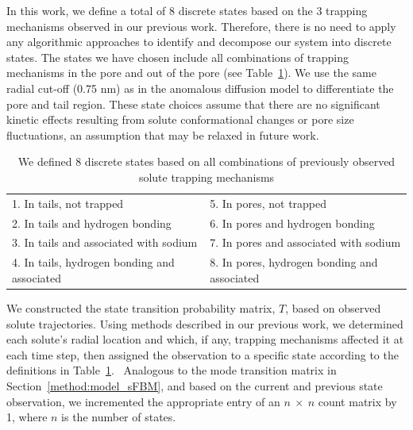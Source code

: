 \documentclass{article}
\begin{document}
  In this work, we define a total of 8 discrete states based on the 3 trapping
  mechanisms observed in our previous work. Therefore, there is no need to 
  apply any algorithmic approaches to identify and decompose our system into 
  discrete states. The states we have chosen include all combinations of trapping
  mechanisms in the pore and out of the pore (see Table~\ref{table:states}). We use
  the same radial cut-off (0.75 nm) as in the anomalous diffusion model to differentiate
  the pore and tail region. These state choices assume that there are no significant
  kinetic effects resulting from solute conformational changes or pore size fluctuations,
  an assumption that may be relaxed in future work.
  
  \begin{table}[!htb]
	  \centering
	  \begin{tabular}{|l|l|}
	  \hline
	  1. In tails, not trapped                     & 5. In pores, not trapped                     \\
	  2. In tails and hydrogen bonding             & 6. In pores and hydrogen bonding             \\
	  3. In tails and associated with sodium       & 7. In pores and associated with sodium       \\
	  4. In tails, hydrogen bonding and associated & 8. In pores, hydrogen bonding and associated \\
	  \hline
	  \end{tabular}
	  \caption{We defined 8 discrete states based on all combinations of previously observed solute
	  trapping mechanisms}\label{table:states}  
  \end{table}
  
  We constructed the state transition probability matrix, $T$, based on observed solute trajectories.
  Using methods described in our previous work, we determined each solute's radial location 
  and which, if any, trapping mechanisms affected it at each time step, then assigned the 
  observation to a specific state according to the definitions in Table~\ref{table:states}.~\cite{coscia_chemically_2019}
  Analogous to the mode transition matrix in Section~\ref{method:model_sFBM}, and based on
  the current and previous state observation, we incremented the appropriate entry of an
  $n~\times~n$ count matrix by 1, where $n$ is the number of states.
  
\end{document}

